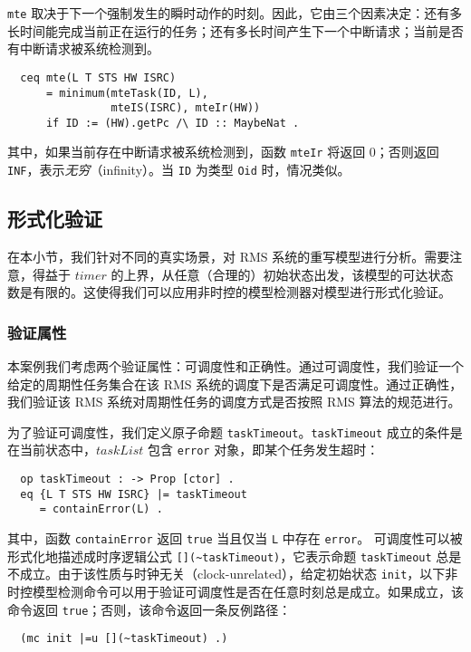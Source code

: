 \verb|mte| 取决于下一个强制发生的瞬时动作的时刻。因此，它由三个因素决定：还有多长时间能完成当前正在运行的任务；还有多长时间产生下一个中断请求；当前是否有中断请求被系统检测到。
\begin{verbatim}
  ceq mte(L T STS HW ISRC)
      = minimum(mteTask(ID, L),
                mteIS(ISRC), mteIr(HW))
      if ID := (HW).getPc /\ ID :: MaybeNat .
\end{verbatim}
其中，如果当前存在中断请求被系统检测到，函数 \verb|mteIr| 将返回 0；否则返回 \verb|INF|，表示\emph{无穷}（infinity）。当 \verb|ID| 为类型 \verb|Oid| 时，情况类似。


\subsection{形式化验证}
\label{s:verification}
在本小节，我们针对不同的真实场景，对 RMS 系统的重写模型进行分析。需要注意，得益于 $\mathit{timer}$ 的上界，从任意（合理的）初始状态出发，该模型的可达状态数是有限的。这使得我们可以应用非时控的模型检测器对模型进行形式化验证。

\subsubsection{验证属性}
本案例我们考虑两个验证属性：可调度性和正确性。通过可调度性，我们验证一个给定的周期性任务集合在该 RMS 系统的调度下是否满足可调度性。通过正确性，我们验证该 RMS 系统对周期性任务的调度方式是否按照 RMS 算法的规范进行。

为了验证可调度性，我们定义原子命题 \verb|taskTimeout|。\verb|taskTimeout| 成立的条件是在当前状态中，$\mathit{taskList}$ 包含 \verb|error| 对象，即某个任务发生超时：
\begin{verbatim}
  op taskTimeout : -> Prop [ctor] .
  eq {L T STS HW ISRC} |= taskTimeout 
     = containError(L) .
\end{verbatim}
其中，函数 \verb|containError| 返回 \verb|true| 当且仅当 \verb|L| 中存在 \verb|error|。 可调度性可以被形式化地描述成时序逻辑公式 \verb|[](~taskTimeout)|，它表示命题 \verb|taskTimeout| 总是不成立。由于该性质与时钟无关（clock-unrelated），给定初始状态 \verb|init|，以下非时控模型检测命令可以用于验证可调度性是否在任意时刻总是成立。如果成立，该命令返回 \verb|true|；否则，该命令返回一条反例路径：
\begin{verbatim}
  (mc init |=u [](~taskTimeout) .)
\end{verbatim}

